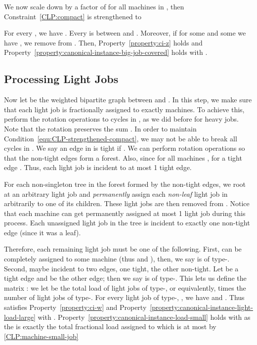 \documentclass[11pt]{article}
\newcounter{prop}
\begin{document}
We now scale down  by a factor of  for all machines in , then Constraint~\eqref{CLP:compact} is strengthened to

For every , we have . Every  is between  and . Moreover, if for some  and some  we have , we remove  from . Then, Property~\ref{property:ci-z} holds and Property~\ref{property:canonical-instance-big-job-covered} holds with .

\subsection{Processing Light Jobs}
Now let  be the weighted bipartite graph between  and . In this step, we make sure that each light job is fractionally assigned to exactly  machines.   To achieve this, perform the rotation operations to cycles in , as we did before for heavy jobs. Note that the rotation preserves the sum . In order to maintain Condition~\eqref{equ:CLP-strengthened-compact}, we may not be able to break all cycles in .  We say an edge  in  is tight if .  We can perform rotation operations so that the non-tight edges form a forest.  Also, since  for all machines ,  for a tight edge .  Thus, each light job  is incident to at most 1 tight edge.

For each non-singleton tree  in the forest formed by the non-tight edges,  we root  at an arbitrary light job and {\em permanently} assign each {\em non-leaf} light job in  arbitrarily to one of its children. These light jobs are then removed from . 
Notice that each machine can get permanently assigned at most 1 light job during this process.  Each unassigned light job in the tree  is incident to exactly one non-tight edge (since it was a leaf).

Therefore, each remaining light job  must be one of the following. First,  can be completely assigned to some machine  (thus  and ), then, we say  is of type-. Second,  maybe incident to two edges, one tight, the other non-tight. Let  be a tight edge and  be the other edge; then we say  is of type-.   This lets us define the matrix : we let  be the total load of light jobs of type-, or equivalently,  times the number of light jobs of type-.  For every light job  of type-, , we have  and .   Thus  satisfies Property~\ref{property:ci-w} and Property~\ref{property:canonical-instance-light-load-large} with .  Property~\ref{property:canonical-instance-load-small} holds with  as the  is exactly the total fractional load assigned to  which is at most  by \eqref{CLP:machine-small-job}
\end{document}
